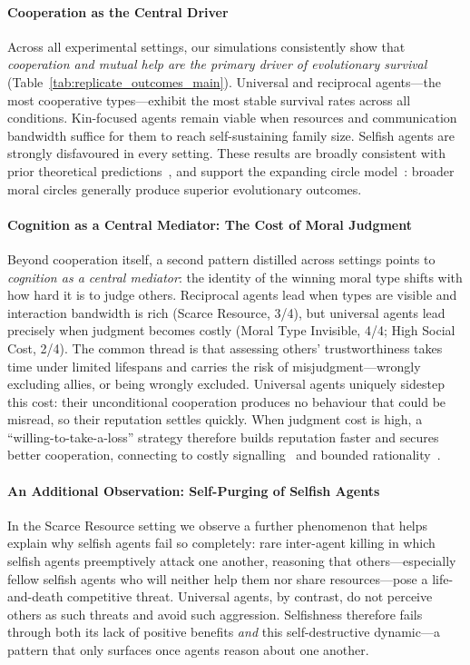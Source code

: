 \paragraph{Cooperation as the Central Driver}
Across all experimental settings, our simulations consistently show that \emph{cooperation and mutual help are the primary driver of evolutionary survival} (Table~\ref{tab:replicate_outcomes_main}). Universal and reciprocal agents---the most cooperative types---exhibit the most stable survival rates across all conditions. Kin-focused agents remain viable when resources and communication bandwidth suffice for them to reach self-sustaining family size. Selfish agents are strongly disfavoured in every setting. These results are broadly consistent with prior theoretical predictions~\citep{hamilton1964genetical,trivers1971evolution,nowak1998dynamics,Curry2019MAC}, and support the expanding circle model~\citep{singer1981expanding}: broader moral circles generally produce superior evolutionary outcomes.

\paragraph{Cognition as a Central Mediator: The Cost of Moral Judgment}
Beyond cooperation itself, a second pattern distilled across settings points to \emph{cognition as a central mediator}: the identity of the winning moral type shifts with how hard it is to judge others. Reciprocal agents lead when types are visible and interaction bandwidth is rich (Scarce Resource, 3/4), but universal agents lead precisely when judgment becomes costly (Moral Type Invisible, 4/4; High Social Cost, 2/4). The common thread is that assessing others' trustworthiness takes time under limited lifespans and carries the risk of misjudgment---wrongly excluding allies, or being wrongly excluded. Universal agents uniquely sidestep this cost: their unconditional cooperation produces no behaviour that could be misread, so their reputation settles quickly. When judgment cost is high, a ``willing-to-take-a-loss'' strategy therefore builds reputation faster and secures better cooperation, connecting to costly signalling~\citep{gintis2001costly, nowak2005evolution} and bounded rationality~\citep{simon1991bounded}.

\paragraph{An Additional Observation: Self-Purging of Selfish Agents}
In the Scarce Resource setting we observe a further phenomenon that helps explain why selfish agents fail so completely: rare inter-agent killing in which selfish agents preemptively attack one another, reasoning that others---especially fellow selfish agents who will neither help them nor share resources---pose a life-and-death competitive threat. Universal agents, by contrast, do not perceive others as such threats and avoid such aggression. Selfishness therefore fails through both its lack of positive benefits \emph{and} this self-destructive dynamic---a pattern that only surfaces once agents reason about one another.

